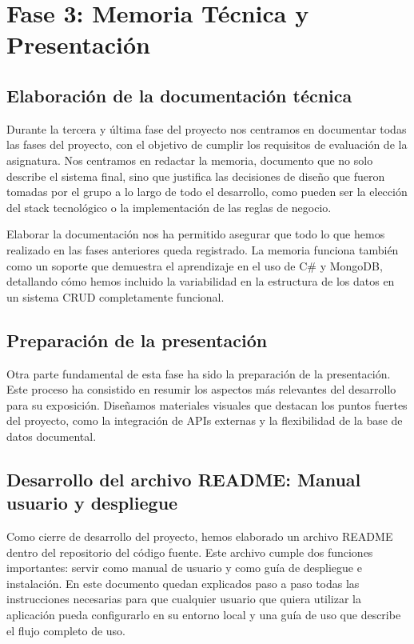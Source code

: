 \chapter{Fase 3: Memoria Técnica y Presentación}\label{cap:documentacion}

\section{Elaboración de la documentación técnica}

Durante la tercera y última fase del proyecto nos centramos en documentar todas las fases del proyecto, con el objetivo de cumplir los requisitos de evaluación de la asignatura. Nos centramos en redactar la memoria, documento que no solo describe el sistema final, sino que justifica las decisiones de diseño que fueron tomadas por el grupo a lo largo de todo el desarrollo, como pueden ser la elección del stack tecnológico o la implementación de las reglas de negocio.

Elaborar la documentación nos ha permitido asegurar que todo lo que hemos realizado en las fases anteriores queda registrado. La memoria funciona también como un soporte que demuestra el aprendizaje en el uso de C\# y MongoDB, detallando cómo hemos incluido la variabilidad en la estructura de los datos en un sistema CRUD completamente funcional.

\section{Preparación de la presentación}

Otra parte fundamental de esta fase ha sido la preparación de la presentación. Este proceso ha consistido en resumir los aspectos más relevantes del desarrollo para su exposición. Diseñamos materiales visuales que destacan los puntos fuertes del proyecto, como la integración de APIs externas y la flexibilidad de la base de datos documental.

\section{Desarrollo del archivo README: Manual usuario y despliegue}

Como cierre de desarrollo del proyecto, hemos elaborado un archivo README dentro del repositorio del código fuente. Este archivo cumple dos funciones importantes: servir como manual de usuario y como guía de despliegue e instalación. En este documento quedan explicados paso a paso todas las instrucciones necesarias para que cualquier usuario que quiera utilizar la aplicación pueda configurarlo en su entorno local y una guía de uso que describe el flujo completo de uso.

